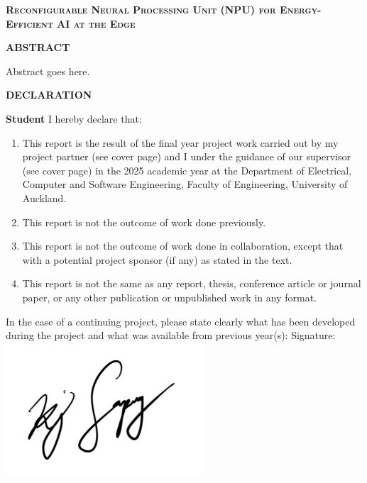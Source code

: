 \documentclass[12pt, a4paper, ukenglish]{article}
\begin{document}
\clearpage

\noindent \reportNumber

\vspace{1em}
\begin{center}
    {\large \textbf{\scshape Reconfigurable Neural Processing Unit (NPU) for Energy-Efficient AI at the Edge}}
\end{center}

\vspace{2em}
\begin{center}
    {\large \textbf{\name}}
\end{center}

\vspace{2em}
\begin{center}
    {\large \textbf{\scshape ABSTRACT}}
\end{center}

Abstract goes here.

% 
\clearpage
\newpage
\vspace{2em}
\begin{center}
\Large\textbf{DECLARATION}
\end{center}
\noindent
\textbf{Student}
\vspace{1em}
I hereby declare that:
\begin{enumerate}
    \item This report is the result of the final year project work carried out by my project partner (see cover page) and I under the guidance of our supervisor (see cover page) in the 2025 academic year at the Department of Electrical, Computer and Software Engineering, Faculty of Engineering, University of Auckland. 
    \item This report is not the outcome of work done previously. 
    \item This report is not the outcome of work done in collaboration, except that with a potential project sponsor (if any) as stated in the text.
    \item This report is not the same as any report, thesis, conference article or journal paper, or any other publication or unpublished work in any format. 
\end{enumerate}
\vspace{1em}
\noindent
In the case of a continuing project, please state clearly what has been developed during the project and what was available from previous year(s): 
\vspace{3cm}
\noindent
\newline
Signature:
\includegraphics[width=0.3\linewidth]{figures/signature.png}
\end{document}
